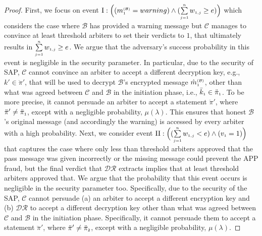 \begin{proof}
 First, we focus on event $\text{\MakeUppercase{\romannumeral 1}}:  \Big((m^{\st\mathcal{(B)}}_{\st1}=warning) \wedge (\sum\limits_{\st j=1}^{\st n}w_{\st 1,j}\geq {e})\Big)$ which considers the case where $\mathcal{B}$ has provided a warning message but $\mathcal{C}$ manages to  convince at least threshold arbiters to  set their verdicts to $1$,  that ultimately results in $\sum\limits_{\scriptscriptstyle j=1}^{\scriptscriptstyle n}w_{\scriptscriptstyle 1,j}\geq e$. We argue that the adversary's success probability in this event is negligible  in the security parameter. In particular, due to the security of SAP, $\mathcal{C}$ cannot convince an arbiter to accept a different decryption key, e.g., $k'\in \ddot\pi'$, that will be used to decrypt $\mathcal{B}$'s encrypted message $\hat {m}^{\scriptscriptstyle(\mathcal {B})}_{\scriptscriptstyle 1}$, other than what was agreed between $\mathcal{C}$ and $\mathcal{B}$ in the initiation phase, i.e., $\bar k_{\scriptscriptstyle 1}\in \ddot \pi_{\scriptscriptstyle 1}$.  To be more precise, it cannot persuade an arbiter to accept a statement $\ddot \pi'$, where $\ddot \pi'\neq \ddot \pi_{\scriptscriptstyle 1}$, except with a negligible probability, $\mu(\lambda)$. This ensures that  honest $\mathcal{B}$’s original message (and accordingly the warning) is accessed by every arbiter with a high probability. Next, we consider event  $\text{\MakeUppercase{\romannumeral 2}}:  \Big((\sum\limits_{\st j=1}^{\st n}w_{\st 1,j}<{e}) \wedge ( {v}_{\st 1}=1)\Big)$ that captures the case where only less than  threshold arbiters approved that the pass message was given incorrectly or the missing message could  prevent the APP fraud, but the final verdict that $\mathcal{DR}$ extracts implies that at least threshold arbiters approved that. We argue that the probability that this event occurs is negligible in the security parameter too. Specifically, due to the security of the SAP,  $\mathcal{C}$ cannot persuade (a)  an arbiter to accept a different encryption key and (b) $\mathcal{DR}$ to accept a different decryption key other than what was agreed between $\mathcal{C}$ and $\mathcal{B}$ in the initiation phase. Specifically, it cannot persuade them to accept a statement $\ddot \pi'$, where $\ddot \pi'\neq \ddot \pi_{\scriptscriptstyle 2}$, except with a negligible probability, $\mu(\lambda)$. %
 

\end{proof}
